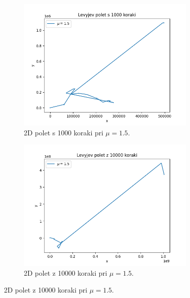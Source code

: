\documentclass[a4paper, 12pt, slovene]{article}
\begin{document}
\begin{figure}[H]
\begin{subfigure}{0.49\textwidth}
	\centering
	\includegraphics[width=0.95\textwidth]{sprehodi/let-1000-1.5.png}
	\caption{2D polet s 1000 koraki pri $\mu = 1.5$.}
	\label{fig-let-1000-1.5}
\end{subfigure}
\begin{subfigure}{0.49\textwidth}
	\centering
	\includegraphics[width=0.95\textwidth]{sprehodi/let-10000-1.5.png}
	\caption{2D polet z 10000 koraki pri $\mu = 1.5$.}
	\label{fig-let-10000-1.5}
\end{subfigure}


\end{figure}
\end{document}
